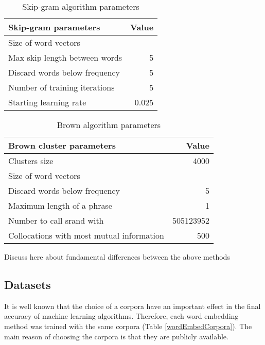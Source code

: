\begin{table}
\centering
\begin{small}
\begin{tabular}{lr}
\hline
\textbf{Skip-gram parameters}  & \textbf{Value} \\ \hline
Size of word vectors &  \\
Max skip length between words & 5 \\ 
Discard words below frequency & 5 \\
Number of training iterations & 5 \\
Starting learning rate & 0.025 \\ \hline
\end{tabular}
\label{skip}
\caption{Skip-gram algorithm parameters}
\end{small}
\end{table}


\begin{table}
\centering
\begin{small}
\begin{tabular}{lr}
\hline
\textbf{Brown cluster parameters}  & \textbf{Value} \\ \hline
Clusters size & 4000 \\ 
Size of word vectors &   \\
Discard words below frequency & 5 \\
Maximum length of a phrase & 1 \\
Number to call srand with & 505123952 \\
Collocations with most mutual information & 500 \\ \hline
\end{tabular}
\label{brown}
\caption{Brown algorithm parameters}
\end{small}
\end{table}


{\color{red}Discuss here about fundamental differences between the above methods}

\subsection{Datasets}
It is well known that the choice of a corpora have an important effect in the final accuracy of machine learning algorithms. 
Therefore, each word embedding method was trained with the same corpora (Table \ref{wordEmbedCorpora}). The main reason of choosing the corpora 
is that they are publicly available. 

